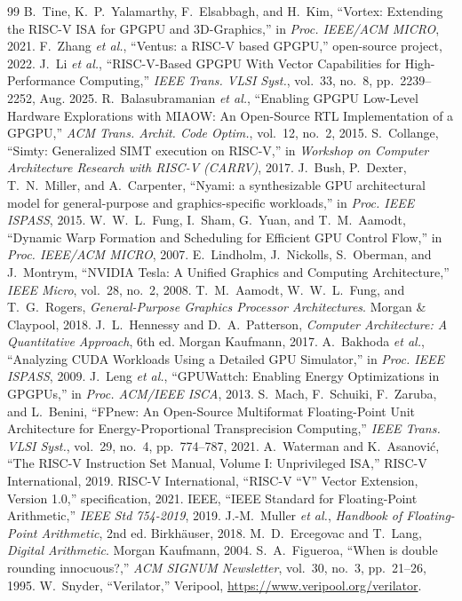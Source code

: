 \documentclass[10pt,conference]{IEEEtran}
\begin{document}
\begin{thebibliography}{99}
 B.~Tine, K.~P.~Yalamarthy, F.~Elsabbagh, and H.~Kim,
``Vortex: Extending the RISC-V ISA for GPGPU and 3D-Graphics,'' in
\emph{Proc. IEEE/ACM MICRO}, 2021.
 F.~Zhang \emph{et al.}, ``Ventus: a RISC-V based GPGPU,''
open-source project, 2022.
 J.~Li \emph{et al.}, ``RISC-V-Based GPGPU With Vector
Capabilities for High-Performance Computing,'' \emph{IEEE Trans. VLSI Syst.},
vol.~33, no.~8, pp.~2239--2252, Aug. 2025.
 R.~Balasubramanian \emph{et al.}, ``Enabling GPGPU Low-Level
Hardware Explorations with MIAOW: An Open-Source RTL Implementation of a GPGPU,''
\emph{ACM Trans. Archit. Code Optim.}, vol.~12, no.~2, 2015.
 S.~Collange, ``Simty: Generalized SIMT execution on RISC-V,''
in \emph{Workshop on Computer Architecture Research with RISC-V (CARRV)}, 2017.
 J.~Bush, P.~Dexter, T.~N.~Miller, and A.~Carpenter,
``Nyami: a synthesizable GPU architectural model for general-purpose and
graphics-specific workloads,'' in \emph{Proc. IEEE ISPASS}, 2015.
 W.~W.~L.~Fung, I.~Sham, G.~Yuan, and T.~M.~Aamodt,
``Dynamic Warp Formation and Scheduling for Efficient GPU Control Flow,'' in
\emph{Proc. IEEE/ACM MICRO}, 2007.
 E.~Lindholm, J.~Nickolls, S.~Oberman, and J.~Montrym,
``NVIDIA Tesla: A Unified Graphics and Computing Architecture,''
\emph{IEEE Micro}, vol.~28, no.~2, 2008.
 T.~M.~Aamodt, W.~W.~L.~Fung, and T.~G.~Rogers,
\emph{General-Purpose Graphics Processor Architectures}. Morgan \& Claypool,
2018.
 J.~L.~Hennessy and D.~A.~Patterson, \emph{Computer
Architecture: A Quantitative Approach}, 6th ed. Morgan Kaufmann, 2017.
 A.~Bakhoda \emph{et al.}, ``Analyzing CUDA Workloads Using a
Detailed GPU Simulator,'' in \emph{Proc. IEEE ISPASS}, 2009.
 J.~Leng \emph{et al.}, ``GPUWattch: Enabling Energy
Optimizations in GPGPUs,'' in \emph{Proc. ACM/IEEE ISCA}, 2013.
 S.~Mach, F.~Schuiki, F.~Zaruba, and L.~Benini, ``FPnew: An
Open-Source Multiformat Floating-Point Unit Architecture for Energy-Proportional
Transprecision Computing,'' \emph{IEEE Trans. VLSI Syst.}, vol.~29, no.~4,
pp.~774--787, 2021.
 A.~Waterman and K.~Asanovi\'c, ``The RISC-V Instruction Set
Manual, Volume I: Unprivileged ISA,'' RISC-V International, 2019.
 RISC-V International, ``RISC-V ``V'' Vector Extension,
Version 1.0,'' specification, 2021.
 IEEE, ``IEEE Standard for Floating-Point Arithmetic,''
\emph{IEEE Std 754-2019}, 2019.
 J.-M.~Muller \emph{et al.}, \emph{Handbook of Floating-Point
Arithmetic}, 2nd ed. Birkh\"auser, 2018.
 M.~D.~Ercegovac and T.~Lang, \emph{Digital Arithmetic}.
Morgan Kaufmann, 2004.
 S.~A.~Figueroa, ``When is double rounding innocuous?,''
\emph{ACM SIGNUM Newsletter}, vol.~30, no.~3, pp.~21--26, 1995.
 W.~Snyder, ``Verilator,'' Veripool,
\url{https://www.veripool.org/verilator}.
\end{thebibliography}
\end{document}
